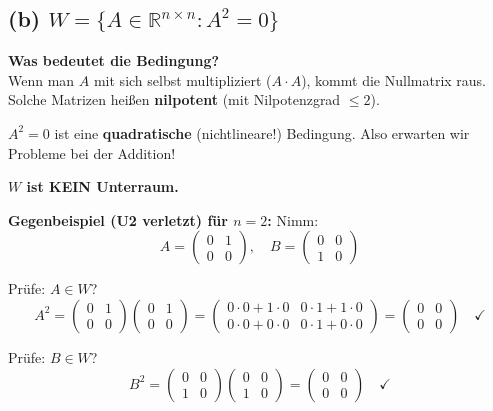 \documentclass[a4paper,12pt]{article}
\begin{document}
\subsection*{(b) \quad $W = \{A \in \mathbb{R}^{n \times n} : A^2 = 0\}$}

\textbf{Was bedeutet die Bedingung?}\\
Wenn man $A$ mit sich selbst multipliziert ($A \cdot A$), kommt die Nullmatrix raus. Solche Matrizen hei\ss en \textbf{nilpotent} (mit Nilpotenzgrad $\leq 2$).

\begin{merkbox}
$A^2 = 0$ ist eine \textbf{quadratische} (nichtlineare!) Bedingung. Also erwarten wir Probleme bei der Addition!
\end{merkbox}

\textbf{$W$ ist KEIN Unterraum.}

\textbf{Gegenbeispiel (U2 verletzt) f\"ur $n = 2$:} Nimm:
\[
A = \begin{pmatrix} 0 & 1 \\ 0 & 0 \end{pmatrix}, \quad
B = \begin{pmatrix} 0 & 0 \\ 1 & 0 \end{pmatrix}
\]

Pr\"ufe: $A \in W$?
\[
A^2 = \begin{pmatrix} 0 & 1 \\ 0 & 0 \end{pmatrix} \begin{pmatrix} 0 & 1 \\ 0 & 0 \end{pmatrix} = \begin{pmatrix} 0 \cdot 0 + 1 \cdot 0 & 0 \cdot 1 + 1 \cdot 0 \\ 0 \cdot 0 + 0 \cdot 0 & 0 \cdot 1 + 0 \cdot 0 \end{pmatrix} = \begin{pmatrix} 0 & 0 \\ 0 & 0 \end{pmatrix} \quad \checkmark
\]

Pr\"ufe: $B \in W$?
\[
B^2 = \begin{pmatrix} 0 & 0 \\ 1 & 0 \end{pmatrix} \begin{pmatrix} 0 & 0 \\ 1 & 0 \end{pmatrix} = \begin{pmatrix} 0 & 0 \\ 0 & 0 \end{pmatrix} \quad \checkmark
\]
\end{document}
